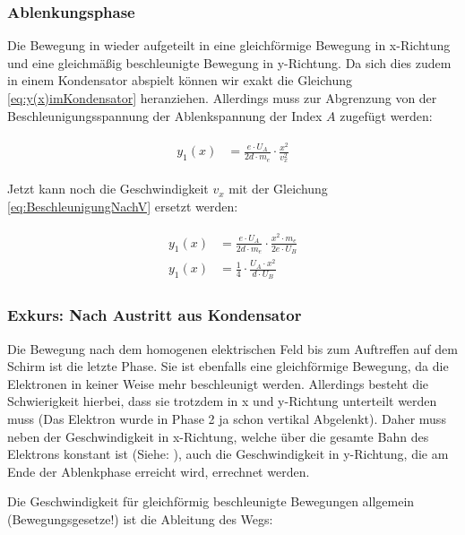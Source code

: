\subsubsection{Ablenkungsphase}

Die Bewegung in wieder aufgeteilt in eine gleichförmige Bewegung in x-Richtung und eine gleichmäßig beschleunigte Bewegung in y-Richtung. Da sich dies zudem in einem Kondensator abspielt können wir exakt die Gleichung \ref{eq:y(x)imKondensator} heranziehen. Allerdings muss zur Abgrenzung von der Beschleunigungsspannung der Ablenkspannung der Index $A$ zugefügt werden:

\begin{align} \label{eq:y_1(x)Braun}
\begin{split}
	y_1(x) &= \frac{e \cdot U_A}{2d \cdot m_e} \cdot \frac{x^2}{v_{x}^2}
\end{split}
\end{align}

Jetzt kann noch die Geschwindigkeit $v_{x}$ mit der Gleichung \ref{eq:BeschleunigungNachV} ersetzt werden:

\begin{align} \label{eq:y_1(x)BraunMitV}
\begin{split}
	y_1(x) &= \frac{e \cdot U_A}{2d \cdot m_e} \cdot \frac{x^2 \cdot m_e}{2e \cdot U_B} \\
	y_1(x) &= \frac{1}{4} \cdot \frac{U_A \cdot x^2}{d \cdot U_B}
\end{split}
\end{align}


\subsubsection{Exkurs: Nach Austritt aus Kondensator}

Die Bewegung nach dem homogenen elektrischen Feld bis zum Auftreffen auf dem Schirm ist die letzte Phase. Sie ist ebenfalls eine gleichförmige Bewegung, da die Elektronen in keiner Weise mehr beschleunigt werden. Allerdings besteht die Schwierigkeit hierbei, dass sie trotzdem in x und y-Richtung unterteilt werden muss (Das Elektron wurde in Phase 2 ja schon vertikal Abgelenkt). Daher muss neben der Geschwindigkeit in x-Richtung, welche über die gesamte Bahn des Elektrons konstant ist (Siehe: ), auch die Geschwindigkeit in y-Richtung, die am Ende der Ablenkphase erreicht wird, errechnet werden. 

Die Geschwindigkeit für gleichförmig beschleunigte Bewegungen allgemein (Bewegungsgesetze!) ist die Ableitung des Wegs:

